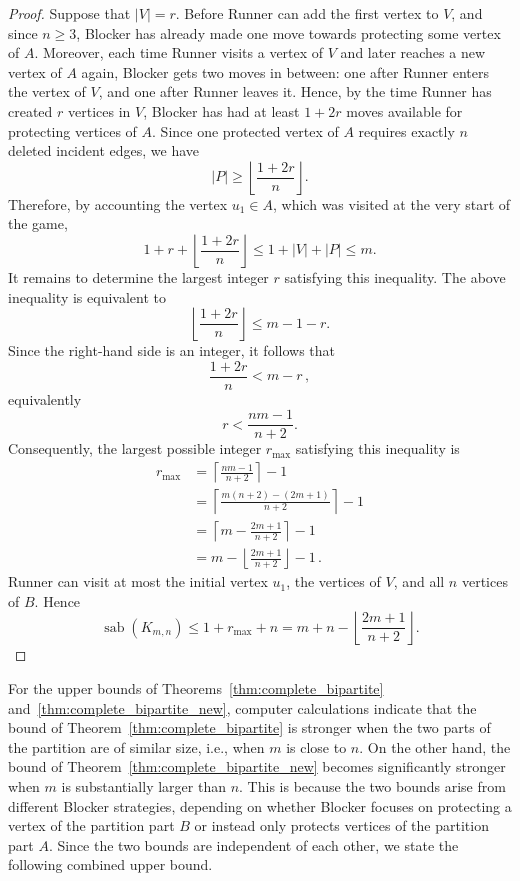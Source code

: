 \documentclass[12pt]{article}
\DeclareMathOperator{\sab}{\mathrm{sab}}
\begin{document}
\begin{proof}
Suppose that $|V|=r$. Before Runner can add the first vertex to $V$, and since $n \ge 3$, Blocker has already made one move towards protecting some vertex of $A$. Moreover, each time
Runner visits a vertex of $V$ and later reaches a new vertex of $A$ again, Blocker gets two moves in between: one after Runner enters the vertex of $V$, and one after Runner leaves it. Hence, by the time Runner has created $r$ vertices in $V$, Blocker has had at least
$1+2r$ moves available for protecting vertices of $A$. Since one protected vertex of $A$ requires exactly $n$ deleted incident edges, we have
$$
|P|\ge \left\lfloor\frac{1+2r}{n}\right\rfloor .
$$
Therefore, by accounting the vertex $u_1 \in A$, which was visited at the very start of the game,
$$
1+r+\left\lfloor\frac{1+2r}{n}\right\rfloor \le 1 + |V| + |P| \le m.$$
It remains to determine the largest integer $r$ satisfying this inequality. The above inequality is equivalent to
$$\left\lfloor\frac{1+2r}{n}\right\rfloor \le m-1-r.$$
Since the right-hand side is an integer, it follows that
$$\frac{1+2r}{n}<m-r\,,$$
equivalently
$$r<\frac{nm-1}{n+2}.$$
Consequently, the largest possible integer $r_{\max}$ satisfying this inequality is
\begin{align*}
r_{\max} &=\left\lceil\frac{nm-1}{n+2}\right\rceil-1\\
        &=\left\lceil\frac{m(n+2)-(2m+1)}{n+2}\right\rceil-1\\
		&=\left\lceil m-\frac{2m+1}{n+2}\right\rceil -1\\
        &=m-\left\lfloor\frac{2m+1}{n+2}\right\rfloor-1\,.
\end{align*}
Runner can visit at most the initial vertex $u_1$, the vertices of $V$, and all $n$ vertices of $B$. Hence
$$\sab(K_{m,n}) \le 1+r_{\max}+n = m+n-\left\lfloor\frac{2m+1}{n+2}\right\rfloor.$$   
\end{proof}

For the upper bounds of Theorems~\ref{thm:complete_bipartite}
and~\ref{thm:complete_bipartite_new}, computer calculations indicate that the bound of Theorem~\ref{thm:complete_bipartite} is stronger when the two parts of the partition are of similar size, i.e., when $m$ is close to $n$. On the other hand, the bound of
Theorem~\ref{thm:complete_bipartite_new} becomes significantly stronger when $m$ is substantially larger than $n$. This is because the two bounds arise from different Blocker strategies, depending on whether Blocker focuses on protecting a vertex of the partition part $B$ or instead only protects vertices of the partition part $A$. Since the two bounds are independent of each other, we state the following combined upper bound.
\end{document}
